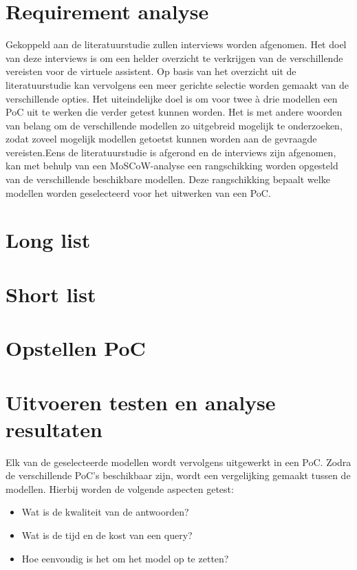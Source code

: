\section{Requirement analyse}


Gekoppeld aan de literatuurstudie zullen interviews worden afgenomen. Het doel van deze interviews is om een helder overzicht te verkrijgen van de verschillende vereisten voor de virtuele assistent. Op basis van het overzicht uit de literatuurstudie kan vervolgens een meer gerichte selectie worden gemaakt van de verschillende opties. Het uiteindelijke doel is om voor twee à drie modellen een PoC uit te werken die verder getest kunnen worden. Het is met andere woorden van belang om de verschillende modellen zo uitgebreid mogelijk te onderzoeken, zodat zoveel mogelijk modellen getoetst kunnen worden aan de gevraagde vereisten.Eens de literatuurstudie is afgerond en de interviews zijn afgenomen, kan met behulp van een MoSCoW-analyse een rangschikking worden opgesteld van de verschillende beschikbare modellen. Deze rangschikking bepaalt welke modellen worden geselecteerd voor het uitwerken van een PoC.

\section{Long list}

\section{Short list}

\section{Opstellen PoC}

\section{Uitvoeren testen en analyse resultaten}

Elk van de geselecteerde modellen wordt vervolgens uitgewerkt in een PoC. Zodra de verschillende PoC’s beschikbaar zijn, wordt een vergelijking gemaakt tussen de modellen. Hierbij worden de volgende aspecten getest:

\begin{itemize} 
    \item Wat is de kwaliteit van de antwoorden? 
    \item Wat is de tijd en de kost van een query?
    \item Hoe eenvoudig is het om het model op te zetten? 
\end{itemize}

